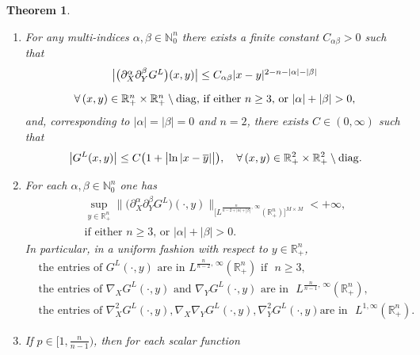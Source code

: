 \documentclass[11pt,reqno]{amsart}
\numberwithin{equation}{section}
\newtheorem{theorem}{Theorem}[section]
\theoremstyle{remark}
\begin{document}
\begin{theorem}
\begin{enumerate}
\vskip 0.08in
\item[(7)] For any multi-indices $\alpha,\beta\in\mathbb{N}_0^n$ 
there exists a finite constant $C_{\alpha\beta}>0$ such that
%
\begin{equation}\label{mainest2G}
\begin{array}{c}
\big|\big(\partial^\alpha_X\partial^\beta_Y G^L\big)(x,y)\big|
\leq C_{\alpha\beta}|x-y|^{2-n-|\alpha|-|\beta|}
\\[10pt]
\text{$\forall\,(x,y)\in{\mathbb{R}}^n_{+}\times{\mathbb{R}}^n_{+}\setminus{\rm diag}$,
if either $n\geq 3$, or $|\alpha|+|\beta|>0$},
\end{array}
\end{equation}
%
and, corresponding to $|\alpha|=|\beta|=0$ and $n=2$, there exists
$C\in(0,\infty)$ such that 
%
\begin{equation}\label{maKnaTTGB}
\big|G^L(x,y)\big|\leq C\big(1+\big|\!\ln|x-\overline{y}|\big|\big),
\quad\forall\,(x,y)\in{\mathbb{R}}^2_{+}\times{\mathbb{R}}^2_{+}\setminus{\rm diag}.
\end{equation}
%
\item[(8)] For each $\alpha,\beta\in\mathbb{N}_0^n$ one has
%
\begin{equation}\label{mainest3G}
\begin{array}{c}
\sup\limits_{y\in{\mathbb{R}}^n_{+}}\big\|\big(\partial^\alpha_X
\partial^\beta_Y G^L\big)(\cdot,y)\big\|_{\big[L^{\frac{n}{n-2+|\alpha|+|\beta|},\,\infty}({\mathbb{R}}^n_{+})
\big]^{M\times M}}<+\infty,
\\[10pt]
\text{if either $n\geq 3$, or $|\alpha|+|\beta|>0$}.
\end{array}
\end{equation}
%
In particular, in a uniform fashion with respect to $y\in{\mathbb{R}}^n_{+}$, 
%
\begin{align}\label{mainest2G.1}
& \text{the entries of $G^L(\cdot,y)$ are in $L^{\frac{n}{n-2},\,\infty}({\mathbb{R}}^n_{+})$ if }\,\,n\geq 3,
\\[4pt]
& \text{the entries of $\nabla_X G^L(\cdot,y)$ and $\nabla_Y G^L(\cdot,y)$ are in }\,\,
L^{\frac{n}{n-1},\,\infty}({\mathbb{R}}^n_{+}),
\label{mainest2G.2}
\\[4pt]
& \text{the entries of $\nabla^2_X G^L(\cdot,y),\nabla_X\nabla_Y G^L(\cdot,y),\nabla^2_Y G^L(\cdot,y)$
are in }\,\,L^{1,\infty}({\mathbb{R}}^n_{+}).
\label{mainest2G.3}
\end{align}
%
\item[(9)] If $p\in\big[1,\frac{n}{n-1}\big)$, then for each scalar function

\end{enumerate}
\end{theorem}
\end{document}
